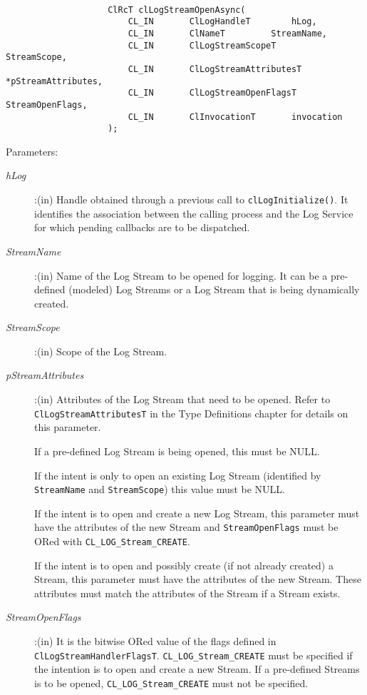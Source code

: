 \begin{flushleft}
\begin{Desc}
\begin{verbatim}
					
					ClRcT clLogStreamOpenAsync(
						CL_IN		ClLogHandleT		hLog,
						CL_IN		ClNameT			StreamName,
						CL_IN 		ClLogStreamScopeT		StreamScope,
						CL_IN		ClLogStreamAttributesT	*pStreamAttributes,
						CL_IN		ClLogStreamOpenFlagsT	StreamOpenFlags,
						CL_IN		ClInvocationT		invocation
					);

\end{verbatim}
\normalsize
\end{Desc}
\begin{Desc}
\item[Parameters:] \begin{description}
\item[{\em hLog}]:(in) Handle obtained through a previous call to {\tt{clLogInitialize()}}. It identifies the association between the calling process and 
the Log Service for which pending callbacks are to be dispatched.
\item[{\em StreamName}]:(in) Name of the Log Stream to be opened for logging. It can be a pre-defined (modeled) Log Streams or a Log Stream that is being 
dynamically created.
\item[{\em StreamScope}]:(in) Scope of the Log Stream.
\item[{\em pStreamAttributes}]:(in) Attributes of the Log Stream that need to be opened. Refer to {\tt{ClLogStreamAttributesT}} in the Type Definitions 
chapter for details on this parameter. 
\par 
If a pre-defined Log Stream is being opened, this must be NULL. 
\par
If the intent is only to open an existing Log Stream (identified by {\tt{StreamName}} and {\tt{StreamScope}}) this value must be NULL. 
\par
If the intent is to open and create a new Log Stream, this parameter must have the attributes of the new Stream and {\tt{StreamOpenFlags}} must
be ORed with {\tt{CL\_\-LOG\_\-Stream\_\-CREATE}}. 
\par
If the intent is to open and possibly create (if not already created) a Stream, this parameter must have 
the attributes of the new Stream. These attributes must match the attributes of the Stream if a Stream exists.


\item[{\em StreamOpenFlags}]:(in) It is the bitwise ORed value of the flags defined in {\tt{ClLogStreamHandlerFlagsT}}. 
{\tt{CL\_\-LOG\_\-Stream\_\-CREATE}} must be specified if the intention is to open and create a new Stream. If a pre-defined Streams is to be opened, 
{\tt{CL\_\-LOG\_\-Stream\_\-CREATE}} must not be specified.


\end{description}
\end{Desc}
\end{flushleft}
